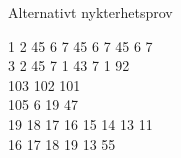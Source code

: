 \begin{song}{Alternativt nykterhetsprov}
	
    
    
	1 2 45 6 7 45 6 7 45 6 7\\
    3 2 45 7 1 43 7 1 92\\
    103 102 101\\
    105 6 19 47\\
    19 18 17 16 15 14 13 11\\
    16 17 18 19 13 55
	
\end{song}
